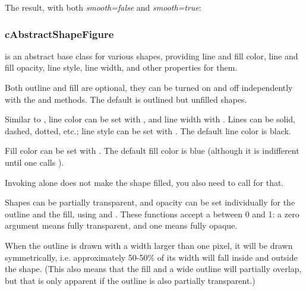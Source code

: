 
The result, with both \textit{smooth=false} and \textit{smooth=true}:

\begin{center}

\end{center}


\subsubsection{cAbstractShapeFigure}
\label{sec:graphics:abstractshapefigure}

 is an abstract base class for various shapes,
providing line and fill color, line and fill opacity, line style, line
width, and other properties for them.

Both outline and fill are optional, they can be turned on and off
independently with the  and 
methods. The default is outlined but unfilled shapes.

Similar to , line color can be set with
, and line width with .
Lines can be solid, dashed, dotted, etc.; line style can be set with
. The default line color is black.

Fill color can be set with . The default fill color
is blue (although it is indifferent until one calls ).

\begin{note}
Invoking  alone does not make the shape filled,
you also need to call  for that.
\end{note}

Shapes can be partially transparent, and opacity can be set individually
for the outline and the fill, using  and
. These functions accept a  between 0
and 1: a zero argument means fully transparent, and one means fully opaque.

When the outline is drawn with a width larger than one pixel, it will be
drawn symmetrically, i.e. approximately 50-50\% of its width will fall
inside and outside the shape. (This also means that the fill and a wide
outline will partially overlap, but that is only apparent if the
outline is also partially transparent.)

